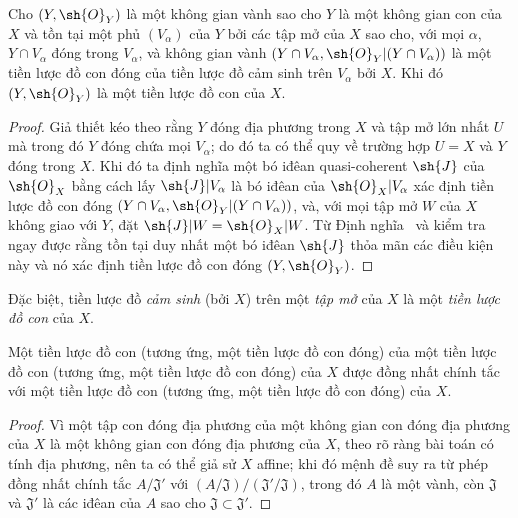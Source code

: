\documentclass[oneside]{amsart}
\newcommand{\oldpage}[2][]{{\marginnote{\normalfont\textbf{#1}~|~#2}}\ignorespaces}
\let\EGAOriginalLabel\label
\renewcommand{\label}[1]{\phantomsection\EGAOriginalLabel{#1}}
\begin{document}
\begin{proposition}[4.1.5]
\label{I.4.1.5}
Cho $(Y,\sh{O}_Y)$ là một không gian vành sao cho $Y$ là một không gian con của $X$ và tồn tại một phủ $(V_\alpha)$ của $Y$ bởi các tập mở của $X$ sao cho, với mọi $\alpha$, $Y\cap V_\alpha$ đóng trong $V_\alpha$, và không gian vành $(Y\cap V_\alpha,\sh{O}_Y|(Y\cap V_\alpha))$ là một tiền lược đồ con đóng của tiền lược đồ cảm sinh trên $V_\alpha$ bởi $X$.
Khi đó $(Y,\sh{O}_Y)$ là một tiền lược đồ con của $X$.
\end{proposition}

\begin{proof}
Giả thiết kéo theo rằng $Y$ đóng địa phương trong $X$ và tập mở lớn nhất $U$ mà trong đó $Y$ đóng chứa mọi $V_\alpha$;
do đó ta có thể quy về trường hợp $U=X$ và $Y$ đóng trong $X$.
Khi đó ta định nghĩa một bó iđêan quasi-coherent $\sh{J}$ của $\sh{O}_X$ bằng cách lấy $\sh{J}|V_\alpha$ là bó iđêan của $\sh{O}_X|V_\alpha$ xác định tiền lược đồ con đóng $(Y\cap V_\alpha,\sh{O}_Y|(Y\cap V_\alpha))$, và, với mọi tập mở $W$ của $X$ không giao với $Y$, đặt $\sh{J}|W=\sh{O}_X|W$.
Từ Định nghĩa~ và  kiểm tra ngay được rằng tồn tại duy nhất một bó iđêan $\sh{J}$ thỏa mãn các điều kiện này và nó xác định tiền lược đồ con đóng $(Y,\sh{O}_Y)$.
\end{proof}

Đặc biệt, tiền lược đồ \emph{cảm sinh} (bởi $X$) trên một \emph{tập mở} của $X$ là một \emph{tiền lược đồ con} của $X$.

\begin{proposition}[4.1.6]
\label{I.4.1.6}
Một tiền lược đồ con (tương ứng, một tiền lược đồ con đóng) của một tiền lược đồ con
\oldpage[I]{121}
(tương ứng, một tiền lược đồ con đóng) của $X$ được đồng nhất chính tắc với một tiền lược đồ con (tương ứng, một tiền lược đồ con đóng) của $X$.
\end{proposition}

\begin{proof}
Vì một tập con đóng địa phương của một không gian con đóng địa phương của $X$ là một không gian con đóng địa phương của $X$, theo  rõ ràng bài toán có tính địa phương, nên ta có thể giả sử $X$ affine;
khi đó mệnh đề suy ra từ phép đồng nhất chính tắc $A/\mathfrak{J}'$ với $(A/\mathfrak{J})/(\mathfrak{J}'/\mathfrak{J})$, trong đó $A$ là một vành, còn $\mathfrak{J}$ và $\mathfrak{J}'$ là các iđêan của $A$ sao cho $\mathfrak{J}\subset\mathfrak{J}'$.
\end{proof}
\end{document}
